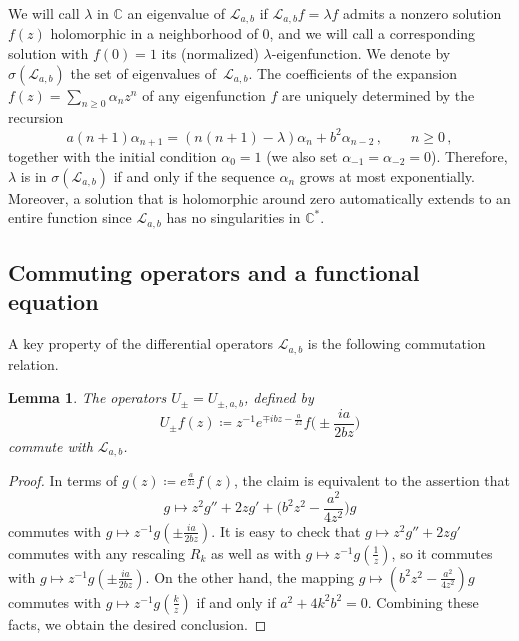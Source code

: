 \documentclass[12pt]{amsart}
\theoremstyle{plain}
\newtheorem{lemma}[theorem]{Lemma}
\numberwithin{equation}{section}
\theoremstyle{definition}
\newcommand{\C}{\mathbb{C}}
\begin{document}
We will call $\lambda$ in $\C$ an eigenvalue of $\mathcal{L}_{a,b}$ if
$\mathcal{L}_{a,b}f=\lambda f$ admits a nonzero solution $f(z)$ holomorphic in
a neighborhood of $0$, and we will call a corresponding solution with $f(0)=1$ its (normalized) $\lambda$-eigenfunction. We denote by $\sigma(\mathcal{L}_{a,b})$ the set of eigenvalues of~$\mathcal{L}_{a,b}$. The coefficients of the expansion $f(z)=\sum_{n\ge0}\alpha_nz^n$ of any eigenfunction $f$ 
are uniquely determined by the recursion
\begin{equation} \label{eq:recursion}
	a(n+1)\alpha_{n+1} = (n(n+1)-\lambda)\alpha_n+b^2\alpha_{n-2}\,,
	\qquad n\ge0\,,
\end{equation}
together with the initial condition $\alpha_0=1$ (we also set $\alpha_{-1}=\alpha_{-2}=0$).
Therefore, $\lambda$ is in $\sigma(\mathcal{L}_{a,b})$ if and only if the sequence
$\alpha_n$ grows at most exponentially. Moreover, a solution that is holomorphic around zero automatically extends to an entire function since $\mathcal{L}_{a,b}$ has no singularities in
$\C^{*}$.

\subsection{Commuting operators and a functional equation}
A key property of the differential operators $\mathcal{L}_{a,b}$ is the following commutation relation.
\begin{lemma} \label{lem:commrel}
	The operators $U_{\pm}=U_{\pm,a,b}$, defined by
		\[U_{\pm}f(z) \coloneqq  z^{-1}e^{\mp i bz -\frac{a}{2z}}f\Big(\pm
\frac{ia}{2bz}\Big)\]
	commute with $\mathcal{L}_{a,b}$.
\end{lemma}
\begin{proof}
	In terms of $g(z)\coloneqq e^{\frac{a}{2z}}f(z)$, the claim is equivalent to the assertion that
	\[g\mapsto  z^2g''+2zg'+\Big(b^2z^2-\frac{a^2}{4z^2}\Big)g\]
	commutes with $g\mapsto z^{-1}g(\pm\frac{ia}{2bz})$. It is easy to check that $g\mapsto z^2g''+2zg'$ commutes with any rescaling $R_k$ as well as with $g\mapsto z^{-1}g(\frac1z)$, so it commutes with $g\mapsto z^{-1}g(\pm\frac{ia}{2bz})$. On the other hand, the mapping $g\mapsto (b^2z^2-\frac{a^2}{4z^2})g$ commutes with $g\mapsto z^{-1}g(\frac{k}z)$ if and only if $a^2+4k^2b^2=0$. Combining these facts, we obtain the desired conclusion.
\end{proof}
\end{document}

